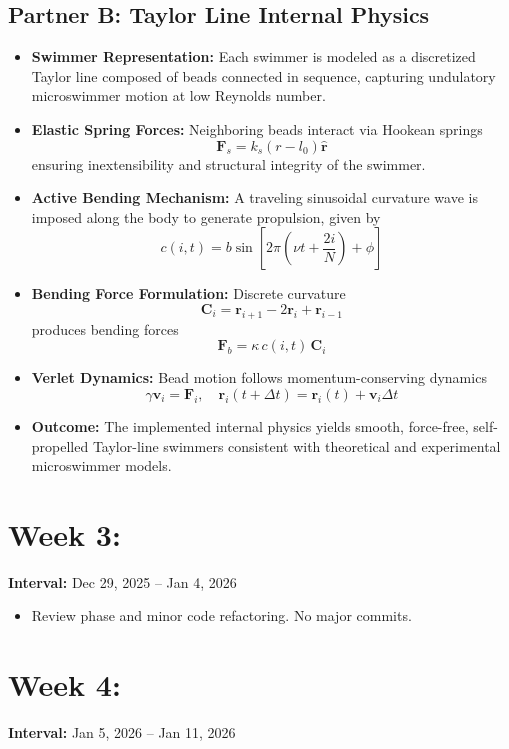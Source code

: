 \documentclass[11pt]{article}
\begin{document}
\subsection*{Partner B: Taylor Line Internal Physics}
\begin{itemize}[noitemsep]
    \item \textbf{Swimmer Representation:} Each swimmer is modeled as a discretized Taylor line composed of beads connected in sequence, capturing undulatory microswimmer motion at low Reynolds number.
    \item \textbf{Elastic Spring Forces:} Neighboring beads interact via Hookean springs
    \[
    \mathbf{F}_s = k_s(r - l_0)\hat{\mathbf{r}}
    \]
    ensuring inextensibility and structural integrity of the swimmer.
    \item \textbf{Active Bending Mechanism:} A traveling sinusoidal curvature wave is imposed along the body to generate propulsion, given by
    \[
    c(i, t) = b \sin\left[2\pi\left(\nu t + \frac{2i}{N}\right) + \phi\right]
    \]
    \item \textbf{Bending Force Formulation:} Discrete curvature
    \[
    \mathbf{C}_i = \mathbf{r}_{i+1} - 2\mathbf{r}_i + \mathbf{r}_{i-1}
    \]
    produces bending forces
    \[
    \mathbf{F}_b = \kappa \, c(i, t) \, \mathbf{C}_i
    \]
    \item \textbf{Verlet Dynamics:} Bead motion follows momentum-conserving dynamics
    \[
    \gamma \mathbf{v}_i = \mathbf{F}_i, \quad \mathbf{r}_i(t + \Delta t) = \mathbf{r}_i(t) + \mathbf{v}_i \Delta t
    \]
    \item \textbf{Outcome:} The implemented internal physics yields smooth, force-free, self-propelled Taylor-line swimmers consistent with theoretical and experimental microswimmer models.
\end{itemize}
\section*{Week 3: }
\textbf{Interval:} Dec 29, 2025 -- Jan 4, 2026

\begin{itemize}[noitemsep]
    \item Review phase and minor code refactoring. No major commits.
\end{itemize}

\section*{Week 4: }
\textbf{Interval:} Jan 5, 2026 -- Jan 11, 2026
\end{document}

